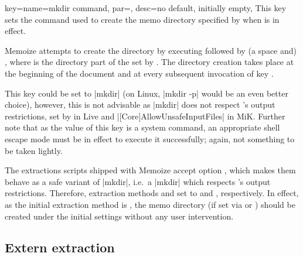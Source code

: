 \documentclass[a4paper,11pt]{article}
\begin{document}
\begin{doc}{
    key={name=mkdir command, par=,
      desc={no default, initially empty}},
  }
  This key sets the command used to create the memo directory specified
  by  when  is in effect.

  Memoize attempts to create the directory by executing 
  followed by (a space and) , where  is the
  directory part of the  set by .  The directory
  creation takes place at the beginning of the document and at every subsequent
  invocation of key .

  This key could be set to |mkdir| (on Linux, |mkdir -p| would be an even
  better choice), however, this is not advisable as |mkdir| does not respect
  's output restrictions, set by  in
  Live and |[Core]AllowUnsafeInputFiles| in MiK.
  Further note that as the value of this key is a system command, an
  appropriate shell escape mode must be in effect to execute it successfully;
  again, not something to be taken lightly.

  The extractions scripts shipped with Memoize accept option
  , which makes them behave as a safe
  variant of |mkdir|, i.e.\ a |mkdir| which respects 's output
  restrictions.  Therefore, extraction methods  and
   set  to
    and
   ,
  respectively.  In effect, as the initial extraction method is
  , the memo directory (if set via  or
  ) should be created under the initial settings without any
  user intervention.
\end{doc}


\subsection{Extern extraction}
\label{sec:ref:externs}
\end{document}

